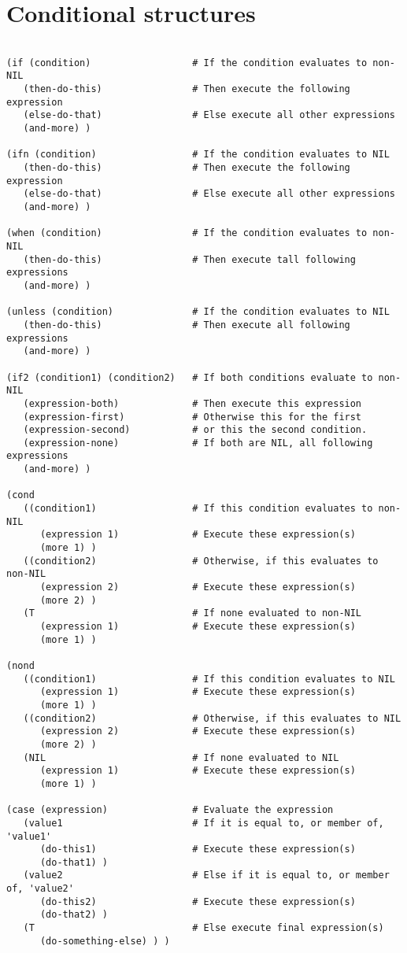 \section*{Conditional structures}

\begin{verbatim}

(if (condition)                  # If the condition evaluates to non-NIL
   (then-do-this)                # Then execute the following expression
   (else-do-that)                # Else execute all other expressions
   (and-more) )

(ifn (condition)                 # If the condition evaluates to NIL
   (then-do-this)                # Then execute the following expression
   (else-do-that)                # Else execute all other expressions
   (and-more) )

(when (condition)                # If the condition evaluates to non-NIL
   (then-do-this)                # Then execute tall following expressions
   (and-more) )

(unless (condition)              # If the condition evaluates to NIL
   (then-do-this)                # Then execute all following expressions
   (and-more) )

(if2 (condition1) (condition2)   # If both conditions evaluate to non-NIL
   (expression-both)             # Then execute this expression
   (expression-first)            # Otherwise this for the first
   (expression-second)           # or this the second condition.
   (expression-none)             # If both are NIL, all following expressions
   (and-more) )

(cond
   ((condition1)                 # If this condition evaluates to non-NIL
      (expression 1)             # Execute these expression(s)
      (more 1) )
   ((condition2)                 # Otherwise, if this evaluates to non-NIL
      (expression 2)             # Execute these expression(s)
      (more 2) )
   (T                            # If none evaluated to non-NIL
      (expression 1)             # Execute these expression(s)
      (more 1) )

(nond
   ((condition1)                 # If this condition evaluates to NIL
      (expression 1)             # Execute these expression(s)
      (more 1) )
   ((condition2)                 # Otherwise, if this evaluates to NIL
      (expression 2)             # Execute these expression(s)
      (more 2) )
   (NIL                          # If none evaluated to NIL
      (expression 1)             # Execute these expression(s)
      (more 1) )

(case (expression)               # Evaluate the expression
   (value1                       # If it is equal to, or member of, 'value1'
      (do-this1)                 # Execute these expression(s)
      (do-that1) )
   (value2                       # Else if it is equal to, or member of, 'value2'
      (do-this2)                 # Execute these expression(s)
      (do-that2) )
   (T                            # Else execute final expression(s)
      (do-something-else) ) )

\end{verbatim}

